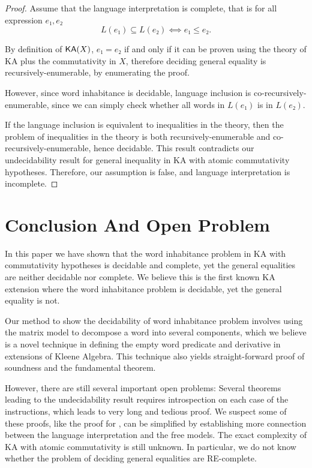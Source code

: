 \begin{proof}
  Assume that the language interpretation is complete,
  that is for all expression \(e₁, e₂\)
  \[L(e₁) ⊆ L(e₂) ⟺ e₁ ≤ e₂.\]

  By definition of \(\mathsf{KA}(X)\), 
  \(e₁ = e₂\) if and only if it can be proven using the theory of KA 
  plus the commutativity in \(X\),
  therefore deciding general equality is recursively-enumerable, by enumerating the proof.

  However, since word inhabitance is decidable,
  language inclusion is co-recursively-enumerable,
  since we can simply check whether all words in \(L(e₁)\) is in \(L(e₂)\).

  If the language inclusion is equivalent to inequalities in the theory,
  then the problem of inequalities in the theory is both recursively-enumerable
  and co-recursively-enumerable, hence decidable.
  This result contradicts our undecidability result for general inequality in 
  KA with atomic commutativity hypotheses.
  Therefore, our assumption is false, and language interpretation is incomplete.
\end{proof} 

\section{Conclusion And Open Problem}

In this paper we have shown that the word inhabitance problem 
in KA with commutativity hypotheses is decidable and complete,
yet the general equalities are neither decidable nor complete.
We believe this is the first known KA extension 
where the word inhabitance problem is decidable,
yet the general equality is not.

Our method to show the decidability of word inhabitance problem
involves using the matrix model to decompose a word into several components,
which we believe is a novel technique in defining 
the empty word predicate and derivative in extensions of Kleene Algebra.
This technique also yields straight-forward proof of soundness and the fundamental theorem.

However, there are still several important open problems:
Several theorems leading to the undecidability result requires 
introspection on each case of the instructions, 
which leads to very long and tedious proof.
We suspect some of these proofs, like the proof for , 
can be simplified by establishing more 
connection between the language interpretation and the free models.
The exact complexity of KA with atomic commutativity is still unknown.
In particular, we do not know whether the problem of 
deciding general equalities are RE-complete.





